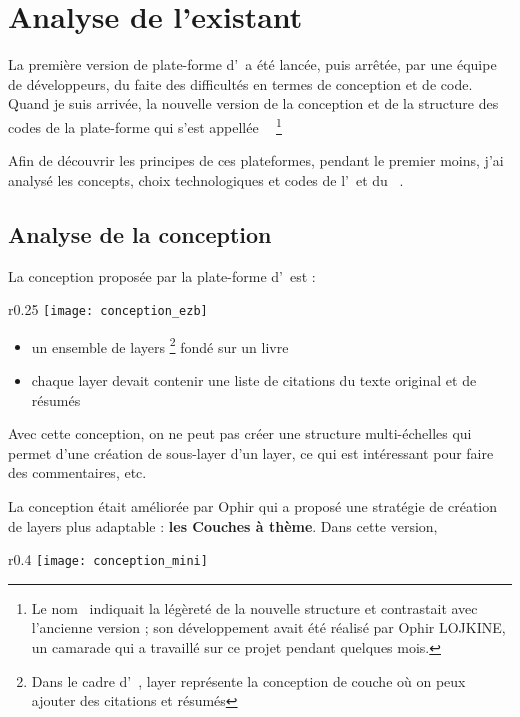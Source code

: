 \section{Analyse de l'existant}

La première version de plate-forme d’\ezb\ a été lancée, puis arrêtée, par une équipe de développeurs, du faite des difficultés en termes de conception et de code. Quand je suis arrivée, la nouvelle version de la conception et de la structure des codes de la plate-forme qui s'est appellée \textbf{\mini\ } \footnote{Le nom \mini\ indiquait la légèreté de la nouvelle structure et contrastait avec l'ancienne version ; son développement avait été réalisé par Ophir LOJKINE, un camarade qui a travaillé sur ce projet pendant quelques mois. }

Afin de découvrir les principes de ces plateformes, pendant le premier moins, j’ai analysé les concepts, choix technologiques et codes de l'\ezb\ et du \mini\ .  

\subsection{Analyse de la conception}
La conception proposée par la plate-forme d’\ezb\ est :
\begin{wrapfigure}{r}{0.25\textwidth}
    \centering
    \texttt{[image: conception\_ezb]}
\end{wrapfigure}
\begin{itemize}
    \item un ensemble de layers \footnote{Dans le cadre d'\ezb\ , layer représente la conception de couche où on peux ajouter des citations et résumés} fondé sur un livre
    \item chaque layer devait contenir une liste de citations du texte original et de résumés
\end{itemize}
Avec cette conception, on ne peut pas créer une structure multi-échelles qui permet d'une création de sous-layer d'un layer, ce qui est intéressant pour faire des commentaires, etc.

La conception était améliorée par Ophir qui a proposé une stratégie de création de layers plus adaptable : \textbf{les Couches à thème}. Dans cette version, 

\begin{wrapfigure}{r}{0.4\textwidth}
    \centering
    \texttt{[image: conception\_mini]}
\end{wrapfigure}


